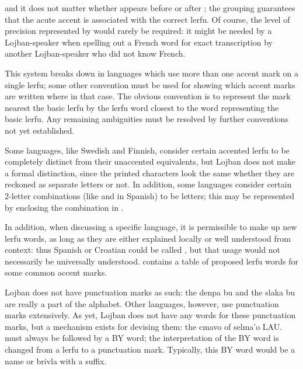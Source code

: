 {\noindent}and it does not matter whether 
    appears before or after ; the  grouping
    guarantees that the acute accent is associated with the correct
    lerfu. Of course, the level of precision represented by  would rarely be required: it might
    be needed by a Lojban-speaker when spelling out a French word
    for exact transcription by another Lojban-speaker who did not
    know French. 

This system breaks down in languages which use more than one
    accent mark on a single lerfu; some other convention must be
    used for showing which accent marks are written where in that
    case. The obvious convention is to represent the mark nearest
    the basic lerfu by the lerfu word closest to the word
    representing the basic lerfu. Any remaining ambiguities must be
    resolved by further conventions not yet established.

Some languages, like Swedish and Finnish, consider certain
    accented lerfu to be completely distinct from their unaccented
    equivalents, but Lojban does not make a formal distinction,
    since the printed characters look the same whether they are
    reckoned as separate letters or not. In addition, some
    languages consider certain 2-letter combinations (like 
    and  in Spanish) to be letters; this may be represented
    by enclosing the combination in .

In addition, when discussing a specific language, it is
    permissible to make up new lerfu words, as long as they are
    either explained locally or well understood from context: thus
    Spanish  or Croatian  could be called , but
    that usage would not necessarily be universally understood.  contains a table of proposed
    lerfu words for some common accent marks.



Lojban does not have punctuation marks as such: the denpa bu
    and the slaka bu are really a part of the alphabet. Other
    languages, however, use punctuation marks extensively. As yet,
    Lojban does not have any words for these punctuation marks, but
    a mechanism exists for devising them: the cmavo  of
    selma'o LAU.  must always be followed by a BY word; the
    interpretation of the BY word is changed from a lerfu to a
    punctuation mark. Typically, this BY word would be a name or
    brivla with a  suffix.

